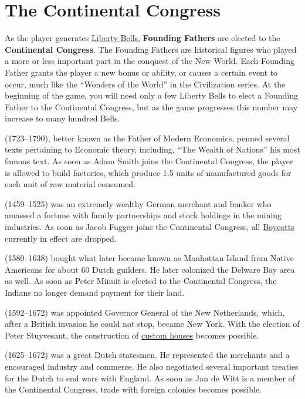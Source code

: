 \documentclass[12pt]{article}
\begin{document}
\hypertarget{Continental Congress}{\section{The Continental Congress}}

As the player generates \hyperlink{Liberty Bells}{Liberty Bells},
\hypertarget{Founding Fathers}{\textbf{Founding Fathers}} are elected
to the {\textbf{Continental Congress}}. The Founding Fathers are
historical figures who played a more or less important part in the
conquest of the New World. Each Founding Father grants the player a
new bonus or ability, or causes a certain event to occur, much like
the ``Wonders of the World'' in the Civilization series. At the
beginning of the game, you will need only a few Liberty Bells to elect
a Founding Father to the Continental Congress, but as the game
progresses this number may increase to many hundred Bells.

 (1723--1790), better known as the Father of Modern
Economics, penned several texts pertaining to Economic theory,
including, ``The Wealth of Nations'' his most famous text. As soon as
Adam Smith joins the Continental Congress, the player is allowed to
build factories, which produce 1.5 units of manufactured goods for
each unit of raw material consumed. 

 (1459--1525) was an extremely wealthy German
merchant and banker who amassed a fortune with family partnerships and
stock holdings in the mining industries. As soon as Jacob Fugger joins
the Continental Congress, all \hyperlink{Boycotts}{Boycotts} currently
in effect are dropped. 

 (1580--1638) bought what later became known as
Manhattan Island from Native Americans for about 60 Dutch guilders. He
later colonized the Delware Bay area as well. As soon as Peter Minuit
is elected to the Continental Congress, the Indians no longer demand
payment for their land. 

 (1592--1672) was appointed Governor General
of the New Netherlands, which, after a British invasion he could not
stop, became New York. With the election of Peter Stuyvesant, the
construction of \hyperlink{Custom House}{custom houses} becomes
possible. 

 (1625--1672) was a great Dutch statesmen.  He
represented the merchants and a encouraged industry and commerce. He
also negotiated several important treaties for the Dutch to end wars
with England. As soon as Jan de Witt is a member of the Continental
Congress, trade with foreign colonies becomes possible.
\end{document}
